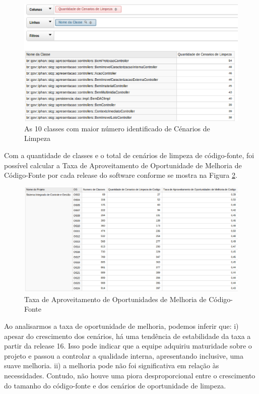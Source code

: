 \begin{figure}[ht!]
\centering
\includegraphics[keepaspectratio=true,scale=0.52]{figuras/10-best.eps}
\caption{As 10 classes com maior número identificado de Cénarios de Limpeza}
\label{fig:worst-10-cenarios}
\end{figure}
\FloatBarrier

Com a quantidade de classes e o total de cenários de limpeza de código-fonte, foi possível calcular a Taxa de Aproveitamento de Oportunidade de Melhoria de Código-Fonte por cada release do software conforme se mostra na Figura \ref{fig:taxa-cenarios}.

\begin{figure}[H]
\centering
\includegraphics[keepaspectratio=true,scale=0.35]{figuras/taxa-parcial.eps}
\caption{Taxa de Aproveitamento de Oportunidades de Melhoria de Código-Fonte}
\label{fig:taxa-cenarios}
\end{figure}
\FloatBarrier

Ao analisarmos a taxa de oportunidade de melhoria, podemos inferir que: i) apesar do crescimento dos cenários, há uma tendência de estabilidade da taxa a partir da release 16. Isso pode indicar que a equipe adquiriu maturidade sobre o projeto e passou a controlar a qualidade interna, apresentando inclusive, uma suave melhoria.  ii) a melhoria pode não foi significativa em relação às necessidades. Contudo, não houve uma piora desproporcional entre o crescimento do tamanho do código-fonte e dos cenários de oportunidade de limpeza.

